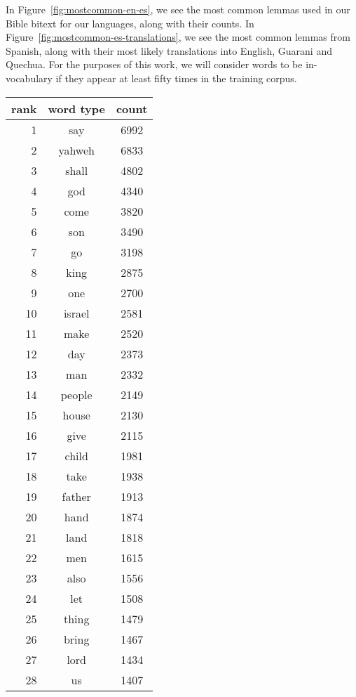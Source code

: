 In Figure~\ref{fig:mostcommon-en-es}, we see the most common lemmas used in our
Bible bitext for our languages, along with their counts. In
Figure~\ref{fig:mostcommon-es-translations}, we see the most common lemmas from
Spanish, along with their most likely translations into English, Guarani and
Quechua. For the purposes of this work, we will consider words to be
in-vocabulary if they appear at least fifty times in the training corpus.

\begin{figure*}
  \begin{tiny}
  \begin{centering}
  \begin{tabular}{|r|c|c|}
    \hline
    rank & word type & count \\
    \hline
1 & say & 6992 \\
2 & yahweh & 6833 \\
3 & shall & 4802 \\
4 & god & 4340 \\
5 & come & 3820 \\
6 & son & 3490 \\
7 & go & 3198 \\
8 & king & 2875 \\
9 & one & 2700 \\
10 & israel & 2581 \\
11 & make & 2520 \\
12 & day & 2373 \\
13 & man & 2332 \\
14 & people & 2149 \\
15 & house & 2130 \\
16 & give & 2115 \\
17 & child & 1981 \\
18 & take & 1938 \\
19 & father & 1913 \\
20 & hand & 1874 \\
21 & land & 1818 \\
22 & men & 1615 \\
23 & also & 1556 \\
24 & let & 1508 \\
25 & thing & 1479 \\
26 & bring & 1467 \\
27 & lord & 1434 \\
28 & us & 1407 \\

\end{tabular}
\end{centering}
\end{tiny}
\end{figure*}
